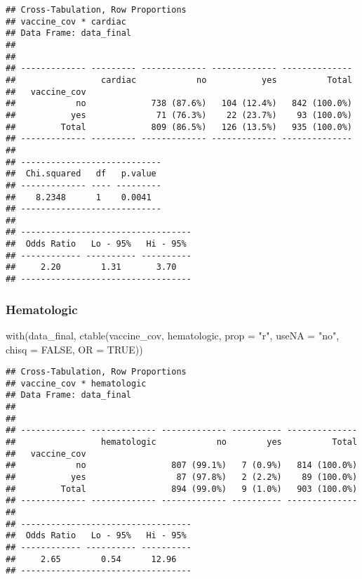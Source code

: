 \documentclass[
]{article}
\newenvironment{Shaded}{\begin{snugshade}}{\end{snugshade}}
\newcommand{\AttributeTok}[1]{\textcolor[rgb]{0.77,0.63,0.00}{#1}}
\newcommand{\ConstantTok}[1]{\textcolor[rgb]{0.00,0.00,0.00}{#1}}
\newcommand{\FunctionTok}[1]{\textcolor[rgb]{0.00,0.00,0.00}{#1}}
\newcommand{\NormalTok}[1]{#1}
\newcommand{\StringTok}[1]{\textcolor[rgb]{0.31,0.60,0.02}{#1}}
\begin{document}
\begin{verbatim}
## Cross-Tabulation, Row Proportions  
## vaccine_cov * cardiac  
## Data Frame: data_final  
## 
## 
## ------------- --------- ------------- ------------- --------------
##                 cardiac            no           yes          Total
##   vaccine_cov                                                     
##            no             738 (87.6%)   104 (12.4%)   842 (100.0%)
##           yes              71 (76.3%)    22 (23.7%)    93 (100.0%)
##         Total             809 (86.5%)   126 (13.5%)   935 (100.0%)
## ------------- --------- ------------- ------------- --------------
## 
## ----------------------------
##  Chi.squared   df   p.value 
## ------------- ---- ---------
##    8.2348      1    0.0041  
## ----------------------------
## 
## ----------------------------------
##  Odds Ratio   Lo - 95%   Hi - 95% 
## ------------ ---------- ----------
##     2.20        1.31       3.70   
## ----------------------------------
\end{verbatim}

\hypertarget{hematologic}{%
\subsubsection{Hematologic}\label{hematologic}}

\begin{Shaded}
\begin{Highlighting}[]
\FunctionTok{with}\NormalTok{(data\_final, }\FunctionTok{ctable}\NormalTok{(vaccine\_cov, hematologic, }\AttributeTok{prop =} \StringTok{"r"}\NormalTok{, }\AttributeTok{useNA =} \StringTok{"no"}\NormalTok{, }\AttributeTok{chisq =} \ConstantTok{FALSE}\NormalTok{, }\AttributeTok{OR =} \ConstantTok{TRUE}\NormalTok{))}
\end{Highlighting}
\end{Shaded}

\begin{verbatim}
## Cross-Tabulation, Row Proportions  
## vaccine_cov * hematologic  
## Data Frame: data_final  
## 
## 
## ------------- ------------- ------------- ---------- --------------
##                 hematologic            no        yes          Total
##   vaccine_cov                                                      
##            no                 807 (99.1%)   7 (0.9%)   814 (100.0%)
##           yes                  87 (97.8%)   2 (2.2%)    89 (100.0%)
##         Total                 894 (99.0%)   9 (1.0%)   903 (100.0%)
## ------------- ------------- ------------- ---------- --------------
## 
## ----------------------------------
##  Odds Ratio   Lo - 95%   Hi - 95% 
## ------------ ---------- ----------
##     2.65        0.54      12.96   
## ----------------------------------
\end{verbatim}
\end{document}
